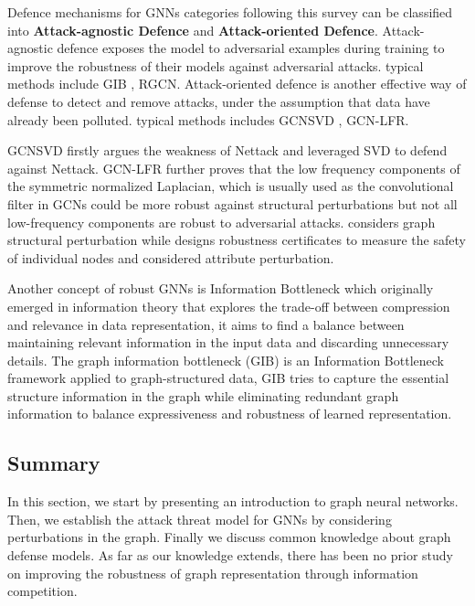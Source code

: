 \documentclass[conference]{IEEEtran}
\begin{document}
Defence mechanisms for GNNs categories following this survey \cite{sun2022adversarial} can be classified into \textbf{Attack-agnostic Defence} and \textbf{Attack-oriented Defence}.
Attack-agnostic defence exposes the model to adversarial examples during training to improve the robustness of their models against adversarial attacks. typical methods include GIB \cite{Tishby2000TheIB}, RGCN\cite{Zhu2019RobustGC}. Attack-oriented defence is another effective way of defense to detect and remove attacks, under the assumption that data have already been polluted. typical methods includes GCNSVD \cite{Entezari2020AllYN}, GCN-LFR\cite{chang2021not}.

GCNSVD\cite{Entezari2020AllYN} firstly argues the weakness of Nettack and leveraged SVD to defend against Nettack. GCN-LFR \cite{chang2021not} further proves that the low frequency components of the symmetric normalized Laplacian, which is usually used as the convolutional filter in GCNs could be more robust against structural perturbations but not all low-frequency components are robust to adversarial attacks. \cite{Bojchevski2019CertifiableRT} considers graph structural perturbation while \cite{Zgner2019CertifiableRA} designs robustness certificates to measure the safety of individual nodes and considered attribute perturbation. 

Another concept of robust GNNs is Information Bottleneck \cite{Tishby2000TheIB} which originally emerged in information theory that explores the trade-off between compression and relevance in data representation, it aims to find a balance between maintaining relevant information in the input data and discarding unnecessary details. The graph information bottleneck (GIB) \cite{wu2020graph}  is an Information Bottleneck framework applied to graph-structured data, GIB tries to capture the essential structure information in the graph while eliminating redundant graph information to balance expressiveness and robustness of learned representation.


\subsection{Summary}
In this section, we start by presenting an introduction to graph neural networks. Then, we establish the attack threat model for GNNs by considering perturbations in the graph. Finally we discuss common knowledge about graph defense models. As far as our knowledge extends, there has been no prior study on improving the robustness of graph representation through information competition.
\end{document}
